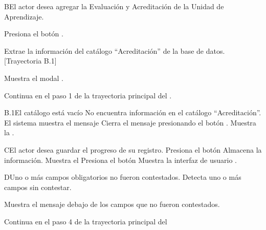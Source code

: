 \begin{UCtrayectoriaA}{B}{El actor desea agregar la Evaluación y Acreditación de la Unidad de Aprendizaje.}

\UCpaso[\UCactor] Presiona el botón .

\UCpaso Extrae la información del catálogo ``Acreditación'' de la base de datos. [Trayectoria B.1]

\UCpaso Muestra el modal .

\UCpaso Continua en el paso 1 de la trayectoria principal del .
\end{UCtrayectoriaA}

\begin{UCtrayectoriaA}{B.1}{El catálogo está vacío}
    \UCpaso No encuentra información en el catálogo ``Acreditación''.
    \UCpaso El sistema muestra el mensaje 
    \UCpaso[\UCactor] Cierra el mensaje presionando el botón .
    \UCpaso Muestra la .
\end{UCtrayectoriaA}

\begin{UCtrayectoriaA}{C}{El actor desea guardar el progreso de su registro.}
\UCpaso[\UCactor] Presiona el botón 
\UCpaso Almacena la información.
\UCpaso Muestra el 
\UCpaso[\UCactor] Presiona el botón  
\UCpaso Muestra la interfaz de usuario .
\end{UCtrayectoriaA}

\begin{UCtrayectoriaA}{D}{Uno o más campos obligatorios no fueron contestados.}
\UCpaso Detecta uno o más campos sin contestar.

\UCpaso Muestra el mensaje  debajo de los campos que no fueron contestados.

\UCpaso Continua en el paso 4 de la trayectoria principal del 
\end{UCtrayectoriaA}

